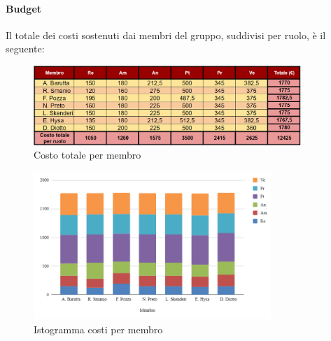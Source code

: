 \vspace{0.6cm}

\paragraph{Budget}
Il totale dei costi sostenuti dai membri del gruppo, suddivisi per ruolo, è il seguente:
\begin{figure}[H]
    \centering
    \includegraphics[width=0.9\textwidth]{../Images/RiepilogoPrezziTot.png}
    \caption{Costo totale per membro}
    \label{fig:CostiRTBPB}
\end{figure}
\begin{figure}[H]
    \centering
    \includegraphics[width=0.8\textwidth]{../Images/graficoCostoRuoloTot.png}
    \caption{Istogramma costi per membro}
    \label{fig:GraficoCostoRTBPB}
\end{figure}